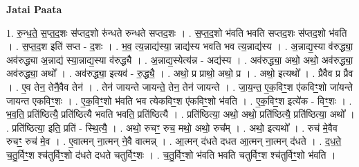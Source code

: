 \documentclass[17pt]{extarticle}
\begin{document}
\textbf{Jatai Paata} \newline

1. रु॒न्ध॒ते॒ स॒प्त॒द॒शः स॑प्तद॒शो रु॑न्धते रुन्धते सप्तद॒शः । . स॒प्त॒द॒शो भ॑वति भवति सप्तद॒शः स॑प्तद॒शो भ॑वति । . स॒प्त॒द॒श इति॑ सप्त - द॒शः । . भ॒व॒ त्य॒न्नाद्य॑स्या॒ न्नाद्य॑स्य भवति भव त्य॒न्नाद्य॑स्य । . अ॒न्नाद्य॒स्या व॑रुद्ध्या॒ अव॑रुद्ध्या अ॒न्नाद्य॑ स्या॒न्नाद्य॒स्या व॑रुद्ध्यै । . अ॒न्नाद्य॒स्येत्य॑न्न - अद्य॑स्य । . अव॑रुद्ध्या॒ अथो॒ अथो॒ अव॑रुद्ध्या॒ अव॑रुद्ध्या॒ अथो᳚ । . अव॑रुद्ध्या॒ इत्यव॑ - रु॒द्ध्यै॒ । . अथो॒ प्र प्राथो॒ अथो॒ प्र । . अथो॒ इत्यथो᳚ । . प्रैवैव प्र प्रैव । . ए॒व तेन॒ तेनै॒वैव तेन॑ । . तेन॑ जायन्ते जायन्ते॒ तेन॒ तेन॑ जायन्ते । . जा॒य॒न्त॒ ए॒क॒विꣳ॒॒श ए॑कविꣳ॒॒शो जा॑यन्ते जायन्त एकविꣳ॒॒शः । . ए॒क॒विꣳ॒॒शो भ॑वति भव त्येकविꣳ॒॒श ए॑कविꣳ॒॒शो भ॑वति । . ए॒क॒विꣳ॒॒श इत्ये॑क - विꣳ॒॒शः । . भ॒व॒ति॒ प्रति॑ष्ठित्यै॒ प्रति॑ष्ठित्यै भवति भवति॒ प्रति॑ष्ठित्यै । . प्रति॑ष्ठित्या॒ अथो॒ अथो॒ प्रति॑ष्ठित्यै॒ प्रति॑ष्ठित्या॒ अथो᳚ । . प्रति॑ष्ठित्या॒ इति॒ प्रति॑ - स्थि॒त्यै॒ । . अथो॒ रुचꣳ॒॒ रुच॒ मथो॒ अथो॒ रुच᳚म् । . अथो॒ इत्यथो᳚ । . रुच॑ मे॒वैव रुचꣳ॒॒ रुच॑ मे॒व । . ए॒वात्मन् ना॒त्मन् ने॒वै वात्मन्न् । . आ॒त्मन् द॑धते दधत आ॒त्मन् ना॒त्मन् द॑धते । . द॒ध॒ते॒ च॒तु॒र्विꣳ॒॒श श्च॑तुर्विꣳ॒॒शो द॑धते दधते चतुर्विꣳ॒॒शः । . च॒तु॒र्विꣳ॒॒शो भ॑वति भवति चतुर्विꣳ॒॒श श्च॑तुर्विꣳ॒॒शो भ॑वति । \newline
\end{document}
